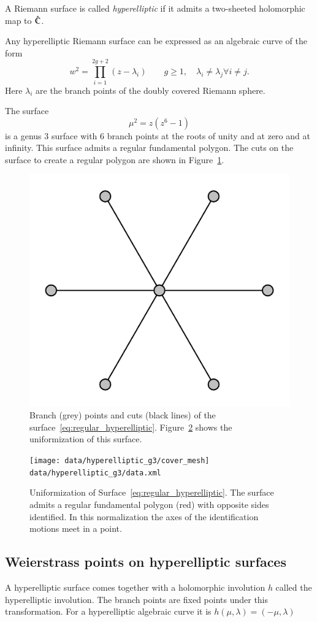 \documentclass[Thesis.tex]{subfiles}
\begin{document}
\begin{definition}
A Riemann surface is called \emph{hyperelliptic} if it admits a two-sheeted
holomorphic map to $\hat{\mathbb C}$.  
\end{definition}

Any hyperelliptic Riemann surface can be expressed as an algebraic curve of
the form \[ w^2 = \prod_{i=1}^{2g+2}(z-\lambda_i) \quad\quad g\geq1,\quad
\lambda_i\neq \lambda_j \forall i\neq j.\] Here $\lambda_i$ are the branch
points of the doubly covered Riemann sphere.

\begin{example} 
The surface 
\begin{equation} 
\label{eq:regular_hyperelliptic}
\mu^2=z(z^6-1) 
\end{equation} is a genus $3$ surface with $6$ branch points at
the roots of unity and at zero and at infinity. This surface admits a regular
fundamental polygon.  The cuts on the surface to create a regular polygon are
shown in Figure~\ref{fig:regular_branchdata}.  
\end{example}

\begin{figure}
\centering
\includegraphics[width=0.2\linewidth]{data/hyperelliptic_g3/curve}
\caption{Branch (grey) points and cuts (black lines) of the surface~\ref{eq:regular_hyperelliptic}.
Figure~\ref{fig:regular_cover} shows the uniformization of this surface.}
\label{fig:regular_branchdata}
\end{figure}

\begin{figure} \centering
\texttt{[image: data/hyperelliptic\_g3/cover\_mesh]}
{\scriptsize\tt data/hyperelliptic\_g3/data.xml} 
\caption{Uniformization of Surface~\ref{eq:regular_hyperelliptic}. The surface
admits a regular fundamental polygon (red) with opposite sides identified. In
this normalization the axes of the identification motions meet in a point.}
\label{fig:regular_cover} 
\end{figure}


\subsection{Weierstrass points on hyperelliptic surfaces}
A hyperelliptic surface comes together with a holomorphic involution $h$
called the hyperelliptic involution. The branch points are fixed points under
this transformation. For a hyperelliptic algebraic curve it is $h(\mu,
\lambda)=(-\mu, \lambda)$
\end{document}
